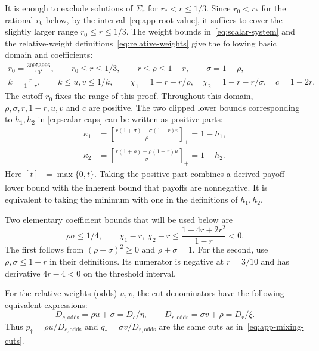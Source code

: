 \documentclass[11pt]{article}
\theoremstyle{remark}
\theoremstyle{plain}
\begin{document}
It is enough to exclude solutions of $\Sigma_r$ for $r_*<r\le1/3$.
Since $r_0<r_*$ for the rational $r_0$ below, by the
interval~\eqref{eq:app-root-value}, it suffices to cover the slightly
larger range $r_0\le r\le1/3$. The weight bounds in~\eqref{eq:scalar-system}
and the relative-weight definitions~\eqref{eq:relative-weights} give
the following basic domain and coefficients:
\begin{equation}
 \begin{gathered}
 r_0=\frac{30953996}{10^8},\qquad r_0\le r\le1/3,\qquad
 r\le\rho\le1-r,\qquad \sigma=1-\rho,\\
 k=\frac r{1-r},\qquad k\le u,v\le1/k,\qquad
 \chi_1=1-r-r/\rho,\quad\chi_2=1-r-r/\sigma,\quad c=1-2r.
 \end{gathered}
 \label{eq:global-basic-domain}
\end{equation}
The cutoff $r_0$ fixes the range of this proof.
Throughout this domain, $\rho,\sigma,r,1-r,u,v$ and $c$ are positive.
The two clipped lower bounds corresponding to $h_1,h_2$ in
\eqref{eq:scalar-caps} can be written as positive parts:
\begin{equation}
 \begin{aligned}
 \kappa_1&=\left[\frac{r(1+\sigma)-\sigma(1-r)v}{\rho}\right]_+=1-h_1,\\
 \kappa_2&=\left[\frac{r(1+\rho)-\rho(1-r)u}{\sigma}\right]_+=1-h_2.
 \end{aligned}
 \label{eq:cap-payoff-lower-bounds}
\end{equation}
Here $[t]_+=\max\{0,t\}$. Taking the positive part combines a
derived payoff lower bound with the inherent bound that payoffs
are nonnegative. It is equivalent to taking the minimum with one
in the definitions of $h_1,h_2$.

Two elementary coefficient bounds that will be used below are
\begin{equation}
 \rho\sigma\le1/4,\qquad
 \chi_1-r,\ \chi_2-r
   \le\frac{1-4r+2r^2}{1-r}<0.
 \label{eq:global-coefficient-signs}
\end{equation}
The first follows from $(\rho-\sigma)^2\ge0$ and $\rho+\sigma=1$.
For the second, use $\rho,\sigma\le1-r$ in their definitions.
Its numerator is negative at $r=3/10$ and has derivative $4r-4<0$
on the threshold interval.

For the relative weights (odds) $u,v$, the cut denominators have the
following equivalent expressions:
\begin{equation}
 D_{c,\mathrm{odds}}=\rho u+\sigma=D_c/\eta,\qquad
 D_{r,\mathrm{odds}}=\sigma v+\rho=D_r/\xi.
 \label{eq:odds-cut-denominators}
\end{equation}
Thus $p_\dagger=\rho u/D_{c,\mathrm{odds}}$ and
$q_\dagger=\sigma v/D_{r,\mathrm{odds}}$ are the same cuts as
in~\eqref{eq:app-mixing-cuts}.
\end{document}
